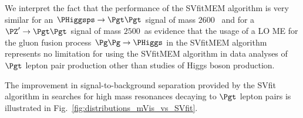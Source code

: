 We interpret the fact that the performance of the SVfitMEM algorithm is very similar for an $\PHiggsps \to \Pgt\Pgt$ signal of mass $2600$~\GeV
and for a $\PZ' \to \Pgt\Pgt$ signal of mass $2500$~\GeV as evidence that the usage of a
LO ME for the gluon fusion process $\Pg\Pg \to \PHiggs$ in the SVfitMEM algorithm represents no limitation for using
the SVfitMEM algorithm in data analyses of $\Pgt$ lepton pair production other than studies of Higgs boson production.

The improvement in signal-to-background separation provided by the
SVfit algorithm in searches for high mass resonances decaying to $\Pgt$ lepton pairs is illustrated in Fig.~\ref{fig:distributions_mVis_vs_SVfit}.

\begin{figure}
\setlength{\unitlength}{1mm}
\begin{center}
\end{center}
\end{figure}
